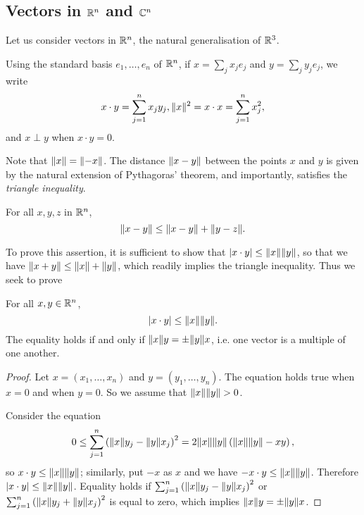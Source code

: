 \documentclass[main.tex]{subfiles}
\begin{document}
		\subsection{Vectors in $\mathbb R^n$ and $\mathbb C^n$}
			Let us consider vectors in $\mathbb R^n$, the natural generalisation of $\mathbb R^3$.
			\begin{definition}
				Using the standard basis $e_1, \ldots, e_n$ of $\mathbb R^n$, if $x = \sum_j x_j e_j$ and $y = \sum_j y_j e_j$, we write
				\begin{equation*}
					x \cdot y = \sum_{j = 1}^{n} x_j y_j, \lVert x\rVert^2 = x \cdot x = \sum_{j = 1}^{n} x^2_j,
				\end{equation*}
				and $x \perp y$ when $x\cdot y = 0$.
			\end{definition}
		Note that $\lVert x\rVert = \lVert-x\rVert$. The distance $\lVert x - y\rVert$ between the points $x$ and $y$ is given by the natural extension of Pythagoras' theorem, and importantly, satisfies the \textit{triangle inequality}.
		\begin{theorem}
			For all $x, y, z$ in $\mathbb R^n$,
			\begin{equation}
				\lVert x - y\rVert \leq \lVert x - y\rVert + \lVert y - z\rVert.
			\end{equation}
		\end{theorem}
		To prove this assertion, it is sufficient to show that $\lvert x \cdot y\rvert \leq \lVert x\rVert \lVert y\rVert$, so that we have $\lVert x + y\rVert \leq \lVert x\rVert + \lVert y\rVert$, which readily implies the triangle inequality. Thus we seek to prove
		\begin{theorem}
			For all $x, y \in \mathbb R^n$,
			\begin{equation}
				\lvert x \cdot y\rvert \leq \lVert x\rVert \lVert y\rVert.
			\end{equation}
			The equality holds if and only if $\lVert x\rVert y = \pm \lVert y\rVert x$, i.e. one vector is a multiple of one another. 
		\end{theorem}
		\begin{proof}
			Let $x = (x_1, \ldots, x_n)$ and $y = (y_1, \ldots, y_n)$. The equation holds true when $x = 0$ and when $y = 0$. So we assume that $\lVert x\rVert \lVert y\rVert > 0$.
			
			Consider the equation
			\begin{equation*}
				0 \leq \sum_{j = 1}^n \left(\lVert x\rVert y_j - \lVert y\rVert x_j\right)^2 = 2\lVert x\rVert \lVert y\rVert \left(\lVert x\rVert \lVert y\rVert - xy\right),
			\end{equation*}
			so $x \cdot y \leq \lVert x\rVert \lVert y\rVert$; similarly, put $ - x $ as $x$ and we have $- x \cdot y \leq \lVert x\rVert\lVert y\rVert$. Therefore $\lvert x \cdot y\rvert \leq \lVert x\rVert \lVert y\rVert$. Equality holds if $\sum_{j = 1}^n \left(\lVert x\rVert y_j - \lVert y\rVert x_j\right)^2$ or $\sum_{j = 1}^n \left(\lVert x\rVert y_j + \lVert y\rVert x_j\right)^2$ is equal to zero, which implies $ \lVert x\rVert y = \pm \lVert y\rVert x$.
		\end{proof}
	
\end{document}
